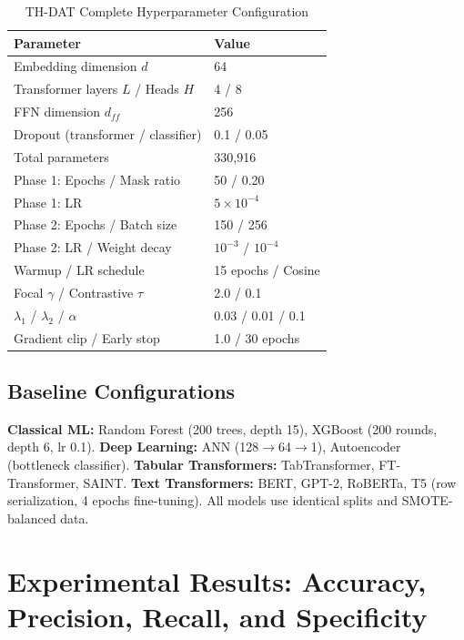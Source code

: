 \documentclass[12pt,a4paper]{article}
\begin{document}
\begin{table}[htbp]
\caption{TH-DAT Complete Hyperparameter Configuration}
\label{tab:hyperparams}
\centering
\begin{tabular}{ll}
\toprule
\textbf{Parameter} & \textbf{Value} \\
\midrule
Embedding dimension $d$ & 64 \\
Transformer layers $L$ / Heads $H$ & 4 / 8 \\
FFN dimension $d_{ff}$ & 256 \\
Dropout (transformer / classifier) & 0.1 / 0.05 \\
Total parameters & 330,916 \\
\midrule
Phase 1: Epochs / Mask ratio & 50 / 0.20 \\
Phase 1: LR & $5 \times 10^{-4}$ \\
\midrule
Phase 2: Epochs / Batch size & 150 / 256 \\
Phase 2: LR / Weight decay & $10^{-3}$ / $10^{-4}$ \\
Warmup / LR schedule & 15 epochs / Cosine \\
Focal $\gamma$ / Contrastive $\tau$ & 2.0 / 0.1 \\
$\lambda_1$ / $\lambda_2$ / $\alpha$ & 0.03 / 0.01 / 0.1 \\
Gradient clip / Early stop & 1.0 / 30 epochs \\
\bottomrule
\end{tabular}
\end{table}

\subsection{Baseline Configurations}

\textbf{Classical ML:} Random Forest (200 trees, depth 15), XGBoost (200 rounds, depth 6, lr 0.1). \textbf{Deep Learning:} ANN (128$\rightarrow$64$\rightarrow$1), Autoencoder (bottleneck classifier). \textbf{Tabular Transformers:} TabTransformer, FT-Transformer, SAINT. \textbf{Text Transformers:} BERT, GPT-2, RoBERTa, T5 (row serialization, 4 epochs fine-tuning). All models use identical splits and SMOTE-balanced data.

\section{Experimental Results: Accuracy, Precision, Recall, and Specificity}
\end{document}
